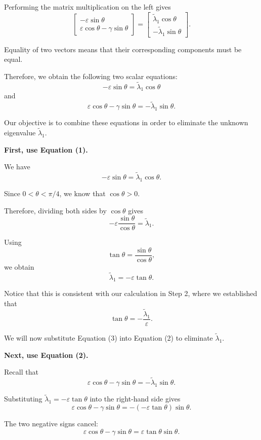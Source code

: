 \documentclass[14pt,letterpaper]{article}
\theoremstyle{plain}
\theoremstyle{definition}
\theoremstyle{remark}
\begin{document}
Performing the matrix multiplication on the left gives
\[
\begin{bmatrix}
-\varepsilon\sin\theta\\
\varepsilon\cos\theta-\gamma\sin\theta
\end{bmatrix}
=
\begin{bmatrix}
\widetilde\lambda_1\cos\theta\\
-\widetilde\lambda_1\sin\theta
\end{bmatrix}.
\]

Equality of two vectors means that their corresponding
components must be equal.

Therefore, we obtain the following two scalar equations:
\[
\boxed{
-\varepsilon\sin\theta
=
\widetilde\lambda_1\cos\theta
}
\tag{1}
\]
and
\[
\boxed{
\varepsilon\cos\theta-\gamma\sin\theta
=
-\widetilde\lambda_1\sin\theta.
}
\tag{2}
\]

Our objective is to combine these equations in order
to eliminate the unknown eigenvalue
$\widetilde\lambda_1$.

\medskip

\noindent\textbf{First, use Equation (1).}

We have
\[
-\varepsilon\sin\theta
=
\widetilde\lambda_1\cos\theta.
\]

Since $0<\theta<\pi/4$, we know that
$\cos\theta>0$.

Therefore, dividing both sides by $\cos\theta$ gives
\[
-\varepsilon
\frac{\sin\theta}{\cos\theta}
=
\widetilde\lambda_1.
\]

Using
\[
\tan\theta=\frac{\sin\theta}{\cos\theta},
\]
we obtain
\[
\boxed{
\widetilde\lambda_1=-\varepsilon\tan\theta.
}
\tag{3}
\]

Notice that this is consistent with our calculation
in Step 2, where we established that
\[
\tan\theta=-\frac{\widetilde\lambda_1}{\varepsilon}.
\]

We will now substitute Equation (3) into Equation (2)
to eliminate $\widetilde\lambda_1$.

\medskip

\noindent\textbf{Next, use Equation (2).}

Recall that
\[
\varepsilon\cos\theta-\gamma\sin\theta
=
-\widetilde\lambda_1\sin\theta.
\]

Substituting
$\widetilde\lambda_1=-\varepsilon\tan\theta$
into the right-hand side gives
\[
\varepsilon\cos\theta-\gamma\sin\theta
=
-(-\varepsilon\tan\theta)\sin\theta.
\]

The two negative signs cancel:
\[
\varepsilon\cos\theta-\gamma\sin\theta
=
\varepsilon\tan\theta\sin\theta.
\]
\end{document}
